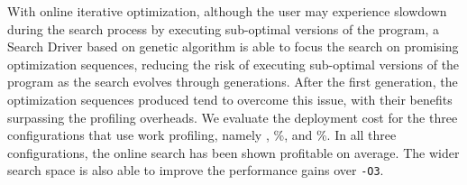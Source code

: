 With online iterative optimization, although the
user may experience slowdown during the search process by executing sub-optimal versions of the program,
a Search Driver based on genetic algorithm is able to focus the search on promising optimization sequences, reducing the risk of
executing sub-optimal versions of the program as the search evolves through generations.
After the first generation, the optimization sequences produced tend to overcome this issue, with their benefits surpassing the profiling overheads.
We evaluate the deployment cost for the three configurations that use work profiling, namely \OptProf, \%, and \%.
In all three configurations, the online search has been shown profitable on average.
The wider search space is also able to improve the performance gains over \texttt{-O3}.
